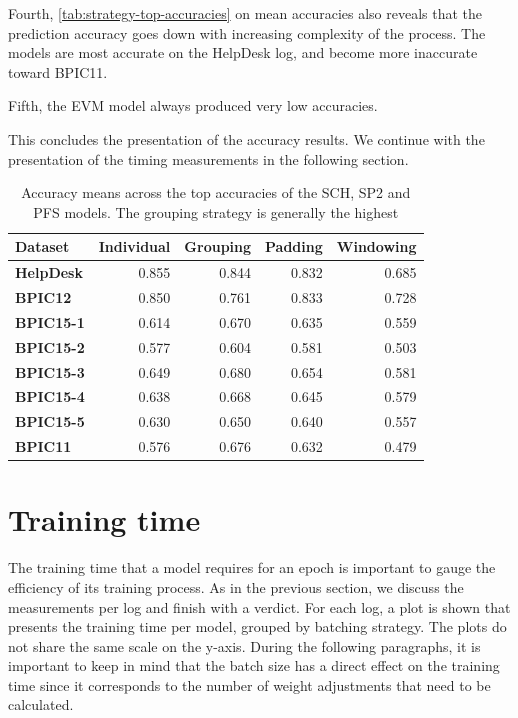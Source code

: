 Fourth, \autoref{tab:strategy-top-accuracies} on mean accuracies also reveals that the prediction accuracy goes down with increasing complexity of the process.
The models are most accurate on the HelpDesk log, and become more inaccurate toward BPIC11.

Fifth, the EVM model always produced very low accuracies.

This concludes the presentation of the accuracy results.
We continue with the presentation of the timing measurements in the following section.

\begin{table}
\centering
\begin{tabular}{lrrrr}
\textbf{Dataset}  &  \textbf{Individual} &  \textbf{Grouping} &   \textbf{Padding} &  \textbf{Windowing}\\
\midrule
\textbf{HelpDesk} &    0.855    &  0.844    &  0.832    &  0.685    \\
\textbf{BPIC12  } &    0.850    &  0.761    &  0.833    &  0.728    \\
\textbf{BPIC15-1} &    0.614    &  0.670    &  0.635    &  0.559    \\
\textbf{BPIC15-2} &    0.577    &  0.604    &  0.581    &  0.503    \\
\textbf{BPIC15-3} &    0.649    &  0.680    &  0.654    &  0.581    \\
\textbf{BPIC15-4} &    0.638    &  0.668    &  0.645    &  0.579    \\
\textbf{BPIC15-5} &    0.630    &  0.650    &  0.640    &  0.557    \\
\textbf{BPIC11  } &    0.576    &  0.676    &  0.632    &  0.479    \\
\end{tabular}
\caption[Grouping strategy leads to best mean accuracies]{Accuracy means across the top accuracies of the SCH, SP2 and PFS models. The grouping strategy is generally the highest}
\label{tab:strategy-top-accuracies}
\end{table}
\FloatBarrier

\section{Training time}\label{sec:eval:training-time}
The training time that a model requires for an epoch is important to gauge the efficiency of its training process.
As in the previous section, we discuss the measurements per log and finish with a verdict.
For each log, a plot is shown that presents the training time per model, grouped by batching strategy.
The plots do not share the same scale on the y-axis.
During the following paragraphs, it is important to keep in mind that the batch size has a direct effect on the training time since it corresponds to the number of weight adjustments that need to be calculated.

